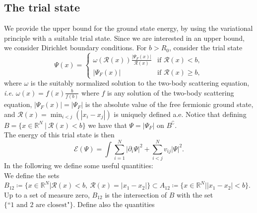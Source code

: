 \documentclass[a4paper,11pt]{article}
\newcommand{\abs}[1]{\left\lvert #1 \right\rvert}
\newcommand{\ie}{\emph{i.e.} }
\newcommand{\R}{\mathbb{R}}
\newcommand{\rr}{\mathcal{R}}
\numberwithin{equation}{section}
\begin{document}
	\subsection{The trial state}
	We provide the upper bound for the ground state energy, by using the variational principle with a suitable trial state. Since we are interested in an upper bound, we consider Dirichlet boundary conditions.
	For $ b>R_0 $, consider the trial state	\begin{equation}
	\Psi(x)=\begin{cases}
	\omega(\rr(x))\frac{\abs{\Psi_F(x)}}{\rr(x)}& \text{if }\rr(x)<b,\\
	\abs{\Psi_F(x)}&\text{if }\rr(x)\geq b,
	\end{cases}
	\end{equation}
	where $ \omega $ is the suitably normalized solution to the two-body scattering equation, \ie $ \omega(x)=f(x)\frac{b}{f(b)} $ where $ f $ is any solution of the two-body scattering equation,  $ \abs{\Psi_F(x)}=\abs{\Psi_F} $ is the absolute value of the free fermionic ground state, and $ \rr(x)=\min_{i<j}(\abs{x_i-x_j}) $ is uniquely defined a.e. Notice that defining $ B=\{x\in\R^N\ \vert\ \mathcal{R}(x)<b \} $ we have that $ \Psi=\abs{\Psi_F} $ on $ B^\complement $.\\
	The energy of this trial state is then\begin{equation}
	\mathcal{E}(\Psi)=\int \sum_{i=1}^{N}\abs{\partial_i\Psi}^2+\sum_{i<j}^{N}v_{ij}\abs{\Psi}^2.
	\end{equation}
	In the following we define some useful quantities:\\
	We define the sets $ B_{12}\coloneqq\{x\in\R^N \vert \rr(x)<b,\ \rr(x)=\abs{x_1-x_2} \}\subset A_{12}\coloneqq\{x\in\R^N\vert \abs{x_1-x_2}<b\} $. Up to a set of measure zero, $ B_{12} $ is the intersection of $ B $ with the set $ \{\text{``1 and 2 are closest"}\} $. Define also the quantities
	
\end{document}
